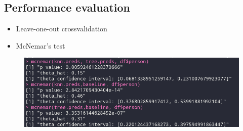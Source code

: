 \documentclass[12pt,fleqn]{article}
\begin{document}
\subsection{Performance evaluation}
\begin{itemize}
	\item Leave-one-out crossvalidation
	\item McNemar's test
\end{itemize}
\begin{figure}[H]
	\centering
	\includegraphics[width=.7\linewidth]{mcnemar_results}
\end{figure}
\end{document}
